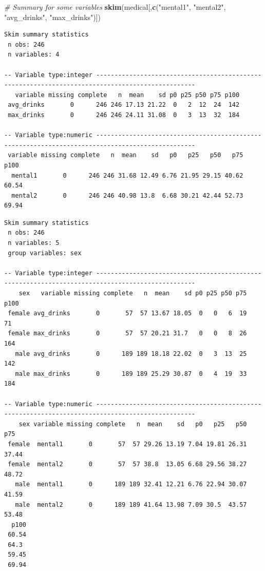 \documentclass[]{book}
\newenvironment{Shaded}{\begin{snugshade}}{\end{snugshade}}
\newcommand{\CommentTok}[1]{\textcolor[rgb]{0.56,0.35,0.01}{\textit{#1}}}
\newcommand{\KeywordTok}[1]{\textcolor[rgb]{0.13,0.29,0.53}{\textbf{#1}}}
\newcommand{\NormalTok}[1]{#1}
\newcommand{\OperatorTok}[1]{\textcolor[rgb]{0.81,0.36,0.00}{\textbf{#1}}}
\newcommand{\StringTok}[1]{\textcolor[rgb]{0.31,0.60,0.02}{#1}}
\begin{document}
\begin{Shaded}
\begin{Highlighting}[]
\CommentTok{# Summary for some variables}
\KeywordTok{skim}\NormalTok{(medical[,}\KeywordTok{c}\NormalTok{(}\StringTok{"mental1"}\NormalTok{, }\StringTok{"mental2"}\NormalTok{, }\StringTok{"avg_drinks"}\NormalTok{, }\StringTok{"max_drinks"}\NormalTok{)])}
\end{Highlighting}
\end{Shaded}

\begin{verbatim}
Skim summary statistics
 n obs: 246 
 n variables: 4 

-- Variable type:integer -------------------------------------------------------------------------------------------------
   variable missing complete   n  mean    sd p0 p25 p50 p75 p100
 avg_drinks       0      246 246 17.13 21.22  0   2  12  24  142
 max_drinks       0      246 246 24.11 31.08  0   3  13  32  184

-- Variable type:numeric -------------------------------------------------------------------------------------------------
 variable missing complete   n  mean    sd   p0   p25   p50   p75  p100
  mental1       0      246 246 31.68 12.49 6.76 21.95 29.15 40.62 60.54
  mental2       0      246 246 40.98 13.8  6.68 30.21 42.44 52.73 69.94
\end{verbatim}

\begin{Shaded}
\end{Shaded}

\begin{verbatim}
Skim summary statistics
 n obs: 246 
 n variables: 5 
 group variables: sex 

-- Variable type:integer -------------------------------------------------------------------------------------------------
    sex   variable missing complete   n  mean    sd p0 p25 p50 p75 p100
 female avg_drinks       0       57  57 13.67 18.05  0   0   6  19   71
 female max_drinks       0       57  57 20.21 31.7   0   0   8  26  164
   male avg_drinks       0      189 189 18.18 22.02  0   3  13  25  142
   male max_drinks       0      189 189 25.29 30.87  0   4  19  33  184

-- Variable type:numeric -------------------------------------------------------------------------------------------------
    sex variable missing complete   n  mean    sd   p0   p25   p50   p75
 female  mental1       0       57  57 29.26 13.19 7.04 19.81 26.31 37.44
 female  mental2       0       57  57 38.8  13.05 6.68 29.56 38.27 48.72
   male  mental1       0      189 189 32.41 12.21 6.76 22.94 30.07 41.59
   male  mental2       0      189 189 41.64 13.98 7.09 30.5  43.57 53.48
  p100
 60.54
 64.3 
 59.45
 69.94
\end{verbatim}
\end{document}
